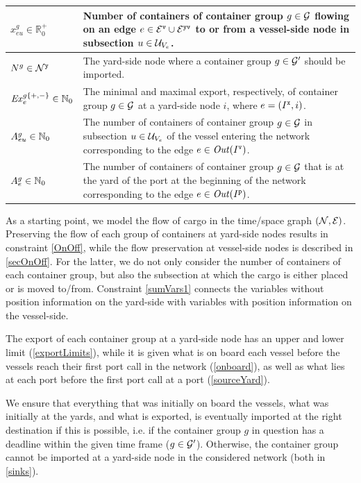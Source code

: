 \begin{table}[width=.9\linewidth,cols=2,pos=htbp]
\begin{tabular*}{\tblwidth}{@{} Lp{10.8cm} @{}}
$x^{g}_{eu}\in\mathbb{R}^+_0$		& Number of containers of container group $g\in\mathcal{G}$ flowing on an edge $e\in\mathcal{E}^\texttt{v}\cup\mathcal{E}^\texttt{yv}$ to or from a vessel-side node in subsection $u\in \mathcal{U}_{V_e}$.\\
\midrule
$N^g\in\mathcal{N}^\texttt{y}$		 		& The yard-side node where a container group $g\in \mathcal{G}'$ should be imported.\\
$\mathit{Ex}^{g\{+,-\}}_e\in\mathbb{N}_0$	
									& The minimal and maximal export, respectively, of container group $g\in \mathcal{G}$ at a yard-side node $i$, where $e=(I^\texttt{x},i)$.\\
$A^{g}_{eu}\in \mathbb{N}_0$			& The number of containers of container group $g\in\mathcal{G}$ in subsection $u\in \mathcal{U}_{V_e}$ of the vessel entering the network corresponding to the edge $e\in\mathit{Out}(I^\texttt{v})$.\\
$A^g_e\in \mathbb{N}_0$					& The number of containers of container group $g\in \mathcal{G}$ that is at the yard of the port at the beginning of the network corresponding to the edge $e\in\mathit{Out}(I^\texttt{p})$.\\
\bottomrule
\end{tabular*}
\end{table}

As a starting point, we model the flow of cargo in the time/space graph $(\mathcal{N},\mathcal{E})$. Preserving the flow of each group of containers at yard-side nodes results in constraint \eqref{OnOff}, while the flow preservation at vessel-side nodes is described in \eqref{secOnOff}. 
For the latter, we do not only consider the number of containers of each container group, but also the subsection at which the cargo is either placed or is moved to/from. Constraint \eqref{sumVars1} connects the variables without position information on the yard-side with variables with position information on the vessel-side. 

The export of each container group at a yard-side node has an upper and lower limit (\ref{exportLimits}), while it is given what is on board each vessel before the vessels reach their first port call in the network (\ref{onboard}), as well as what lies at each port before the first port call at a port (\ref{sourceYard}).

We ensure that everything that was initially on board the vessels, what was initially at the yards, and what is exported, is eventually imported at the right destination if this is possible, i.e. if the container group $g$ in question has a deadline within the given time frame ($g\in\mathcal{G}'$). Otherwise, the container group cannot be imported at a yard-side node in the considered network (both in \eqref{sinks}).  

